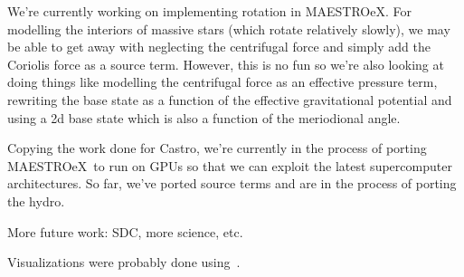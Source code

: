 \documentclass[a4paper]{jpconf}
\newcommand{\maestroex}{{\sffamily MAESTROeX}}
\newcommand{\castro}{{\sffamily Castro}}
\begin{document}
We're currently working on implementing rotation in \maestroex. For modelling the interiors of massive stars (which rotate relatively slowly), we may be able to get away with neglecting the centrifugal force and simply add the Coriolis force as a source term. However, this is no fun so we're also looking at doing things like modelling the centrifugal force as an effective pressure term, rewriting the base state as a function of the effective gravitational potential and using a 2d base state which is also a function of the meriodional angle.

Copying the work done for \castro, we're currently in the process of porting \maestroex~to run on GPUs so that we can exploit the latest supercomputer architectures. So far, we've ported source terms and are in the process of porting the hydro. 

More future work: SDC, more science, etc.




\ack Visualizations were probably done using~\cite{yt}.




\end{document}
